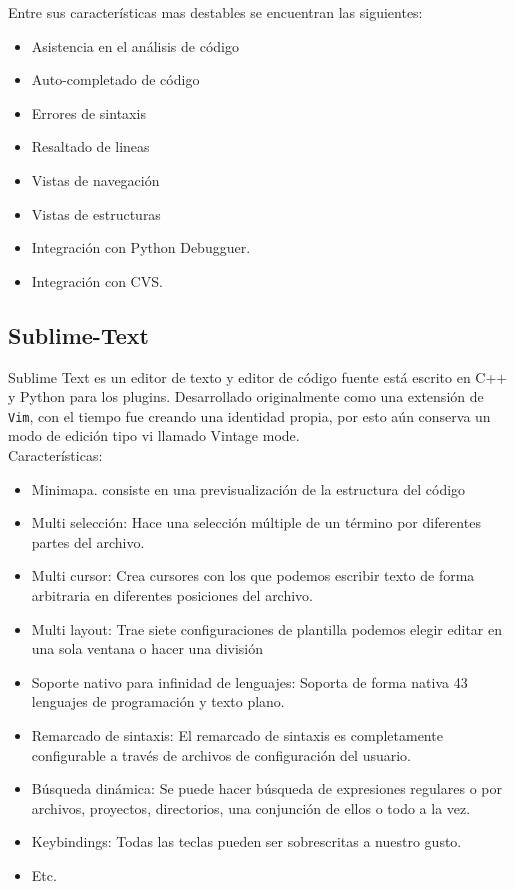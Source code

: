 \documentclass[12pt]{book} %
\begin{document}
		Entre sus características mas destables se encuentran las siguientes:
		\begin{multicols}{2}
		\begin{itemize}
			\item Asistencia en el análisis de código
			\item Auto-completado de código
			\item Errores de sintaxis
			\item Resaltado de lineas
			\item Vistas de navegación
			\item Vistas de estructuras
			\item Integración con Python Debugguer.
			\item Integración con CVS.
		\end{itemize}
		\end{multicols}
		
	\subsection{Sublime-Text \label{subl}}
		Sublime Text es un editor de texto y editor de código fuente está escrito en C++ y Python para los plugins. Desarrollado
		originalmente como una extensión de \texttt{Vim}, con el tiempo fue creando una identidad propia, por esto aún conserva un modo 
		de edición tipo vi llamado Vintage mode.\\
		
		Características:
		\begin{multicols}{2}
			\begin{itemize}
				 \item Minimapa. consiste en una previsualización de la estructura del código
				 \item Multi selección: Hace una selección múltiple de un término por diferentes partes del archivo.
				 \item Multi cursor: Crea cursores con los que podemos escribir texto de forma arbitraria en diferentes posiciones del
				 	   archivo.
				 \item Multi layout: Trae siete configuraciones de plantilla podemos elegir editar en una sola ventana o hacer una división
				 \item Soporte nativo para infinidad de lenguajes: Soporta de forma nativa 43 lenguajes de programación y texto plano.
				 \item Remarcado de sintaxis: El remarcado de sintaxis es completamente configurable a través de archivos de configuración 
				 	   del usuario.
				 \item Búsqueda dinámica: Se puede hacer búsqueda de expresiones regulares o por archivos, proyectos, directorios, una 
				 	   conjunción de ellos o todo a la vez.
				 \item Keybindings: Todas las teclas pueden ser sobrescritas a nuestro gusto.
				 \item Etc.
			\end{itemize}
		\end{multicols}
		
\end{document}
